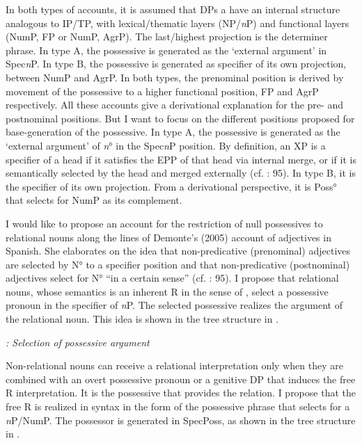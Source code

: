 \documentclass[output=paper]{langsci/langscibook}
\begin{document}
In both types of accounts, it is assumed that DPs a have an internal structure analogous to IP/TP, with lexical/thematic layers (NP/\textit{n}P) and functional layers (NumP, FP or NumP, AgrP). The last/highest projection is the determiner phrase. In type A, the possessive is generated as the ‘external argument’ in Spec\textit{n}P. In type B, the possessive is generated as specifier of its own projection, between NumP and AgrP. In both types, the prenominal position is derived by movement of the possessive to a higher functional position, FP and AgrP respectively. All these accounts give a derivational explanation for the pre- and postnominal positions. But I want to focus on the different positions proposed for base-generation of the possessive. In type A, the possessive is generated as the ‘external argument’ of \textit{n}° in the Spec\textit{n}P position. By definition, an XP is a specifier of a head if it satisfies the EPP of that head via internal merge, or if it is semantically selected by the head and merged externally (cf. \citealt{Demonte2005}: 95). In type B, it is the specifier of its own projection. From a derivational perspective, it is Poss° that selects for NumP as its complement. 

I would like to propose an account for the restriction of null possessives to relational nouns along the lines of Demonte’s (2005) account of adjectives in Spanish. She elaborates on the idea that non-predicative (prenominal) adjectives are selected by N° to a specifier position and that non-predicative (postnominal) adjectives select for N° “in a certain sense” (cf. \citealt{Demonte2005}: 95). I propose that relational nouns, whose semantics is an inherent R in the sense of \citet{Partee1997}, select a possessive pronoun in the specifier of \textit{n}P. The selected possessive realizes the argument of the relational noun. This idea is shown in the tree structure in .

  
 

\textit{: Selection of possessive argument}

Non-relational nouns can receive a relational interpretation only when they are combined with an overt possessive pronoun or a genitive DP that induces the free R interpretation. It is the possessive that provides the relation. I propose that the free R is realized in syntax in the form of the possessive phrase that selects for a \textit{n}P/NumP. The possessor is generated in SpecPoss, as shown in the tree structure in .
\end{document}
